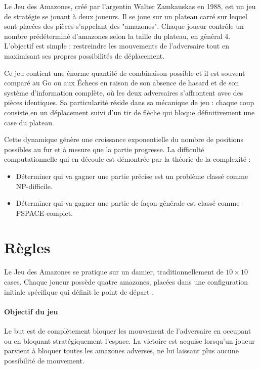 \documentclass[12pt,a4paper,titlepage,oneside]{article}
\begin{document}
Le Jeu des Amazones, créé par l'argentin Walter Zamkauskas en 1988, est un jeu de stratégie se jouant à deux joueurs. Il se joue sur un plateau carré sur lequel sont placées des pièces s'appelant des "amazones". Chaque joueur contrôle un nombre prédéterminé d'amazones selon la taille du plateau, en général 4. L'objectif est simple : restreindre les mouvements de l'adversaire tout en maximisant ses propres possibilités de déplacement.

\medskip

Ce jeu contient une énorme quantité de combinaison possible et il est souvent comparé au Go ou aux Échecs en raison de son absence de hasard et de son système d'information complète, où les deux adversaires s'affrontent avec des pièces identiques. Sa particularité réside dans sa mécanique de jeu : chaque coup consiste en un déplacement suivi d'un tir de flèche qui bloque définitivement une case du plateau.

\medskip

Cette dynamique génère une croissance exponentielle du nombre de positions possibles au fur et à mesure que la partie progresse. La difficulté computationnelle qui en découle est démontrée par la théorie de la complexité : 
\begin{itemize}
    \item Déterminer qui va gagner une partie précise est un problème classé comme NP-difficile.
    \item Déterminer qui va gagner une partie de façon générale est classé comme PSPACE-complet.
\end{itemize}





    \section{Règles}

    Le Jeu des Amazones se pratique sur un damier, traditionnellement de $10 \times 10$ cases. Chaque joueur possède quatre amazones, placées dans une configuration initiale spécifique qui définit le point de départ .
    
    \paragraph{Objectif du jeu}Le but est de complètement bloquer les mouvement de l'adversaire en occupant ou en bloquant stratégiquement l'espace. La victoire est acquise lorsqu'un joueur parvient à bloquer toutes les amazones adverses, ne lui laissant plus aucune possibilité de mouvement.
\end{document}
